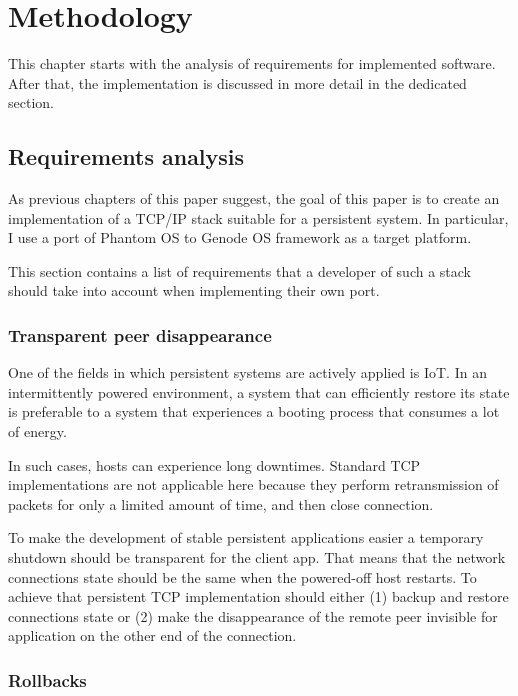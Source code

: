 \chapter{Methodology}
\label{chap:met}

This chapter starts with the analysis of requirements for implemented software.
After that, the implementation is discussed in more detail in the dedicated
section.

\section {Requirements analysis}

As previous chapters of this paper suggest, the goal of this paper is to create
an implementation of a TCP/IP stack suitable for a persistent system. In
particular, I use a port of Phantom OS to Genode OS framework as a target
platform.

This section contains a list of requirements that a developer of such a stack
should take into account when implementing their own port.

\subsection {Transparent peer disappearance}
One of the fields in which persistent systems are actively applied is IoT. In an
intermittently powered environment, a system that can efficiently restore its
state is preferable to a system that experiences a booting process that consumes 
a lot of energy.

In such cases, hosts can experience long downtimes. Standard TCP implementations
are not applicable here because they perform retransmission of packets for only
a limited amount of time, and then close connection.

To make the development of stable persistent applications easier a temporary 
shutdown should be transparent for the client app. That means that the network 
connections state should be the same when the powered-off host restarts.
To achieve that persistent TCP implementation should either (1) backup and
restore connections state or (2) make the disappearance of the remote peer
invisible for application on the other end of the connection.

\subsection {Rollbacks}

